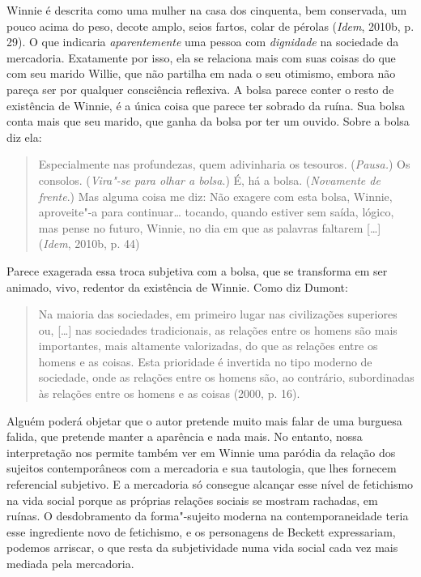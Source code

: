 Winnie é descrita como uma mulher na casa dos cinquenta, bem conservada,
um pouco acima do peso, decote amplo, seios fartos, colar de pérolas
(\emph{Idem}, 2010b, p. 29). O que indicaria \emph{aparentemente} uma
pessoa com \emph{dignidade} na sociedade da mercadoria. Exatamente por
isso, ela se relaciona mais com suas coisas do que com seu marido
Willie, que não partilha em nada o seu otimismo, embora não pareça ser
por qualquer consciência reflexiva. A bolsa parece conter o resto de
existência de Winnie, é a única coisa que parece ter sobrado da ruína.
Sua bolsa conta mais que seu marido, que ganha da bolsa por ter um
ouvido. Sobre a bolsa diz ela:

\begin{quote}
Especialmente nas profundezas, quem adivinharia os tesouros.
(\emph{Pausa.}) Os consolos. (\emph{Vira"-se para olhar a bolsa}.) É, há
a bolsa. (\emph{Novamente de frente}.) Mas alguma coisa me diz: Não
exagere com esta bolsa, Winnie, aproveite"-a para continuar\ldots{} tocando,
quando estiver sem saída, lógico, mas pense no futuro, Winnie, no dia em
que as palavras faltarem [\ldots{}] (\emph{Idem}, 2010b, p. 44)
\end{quote}

Parece exagerada essa troca subjetiva com a bolsa, que se transforma em
ser animado, vivo, redentor da existência de Winnie. Como diz Dumont:

\begin{quote}
Na maioria das sociedades, em primeiro lugar nas civilizações superiores
ou, [\ldots{}] nas sociedades tradicionais, as relações entre os homens
são mais importantes, mais altamente valorizadas, do que as relações
entre os homens e as coisas. Esta prioridade é invertida no tipo moderno
de sociedade, onde as relações entre os homens são, ao contrário,
subordinadas às relações entre os homens e as coisas (2000, p. 16).
\end{quote}

Alguém poderá objetar que o autor pretende muito mais falar de uma
burguesa falida, que pretende manter a aparência e nada mais. No
entanto, nossa interpretação nos permite também ver em Winnie uma
paródia da relação dos sujeitos contemporâneos com a mercadoria e sua
tautologia, que lhes fornecem referencial subjetivo. E a mercadoria só
consegue alcançar esse nível de fetichismo na vida social porque as
próprias relações sociais se mostram rachadas, em ruínas. O
desdobramento da forma"-sujeito moderna na contemporaneidade teria esse
ingrediente novo de fetichismo, e os personagens de Beckett
expressariam, podemos arriscar, o que resta da subjetividade numa vida
social cada vez mais mediada pela mercadoria.

